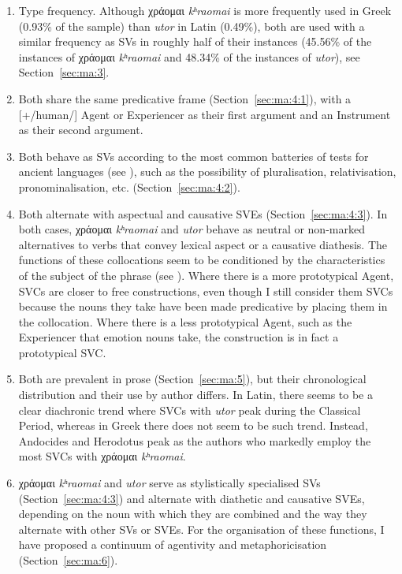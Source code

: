 \documentclass[output=paper,colorlinks,citecolor=brown]{langscibook}
\begin{document}
\begin{enumerate}
   \def\labelenumi{\alph{enumi}.}
 \item Type frequency. Although χράομαι \emph{kʰraomai} is more
   frequently used in Greek (0.93\% of the sample) than \emph{utor} in Latin (0.49\%),
   both are used with a similar frequency as SVs in roughly half of their instances
   (45.56\% of the instances of χράομαι \emph{kʰraomai} and 48.34\% of the instances of \emph{utor}), see
   Section~\ref{sec:ma:3}.
 \item Both share the same predicative frame (Section~\ref{sec:ma:4:1}), with a [+/human/]
   Agent or Experiencer as their first argument and an Instrument as their second argument.
 \item Both behave as SVs according to the most common batteries of tests for ancient
   languages (see \cite{jimenez_lopez_support_2016}), such as the possibility of
   pluralisation, relativisation, pronominalisation, etc. (Section~\ref{sec:ma:4:2}).
 \item Both alternate with aspectual and causative SVEs (Section~\ref{sec:ma:4:3}). In
   both cases, χράομαι \emph{kʰraomai} and \emph{utor} behave as neutral
   or non-marked alternatives to verbs that convey lexical aspect or a causative
   diathesis. The functions of these collocations seem to be conditioned by the
   characteristics of the subject of the phrase (see ). Where there
   is a more prototypical Agent, SVCs are closer to free constructions, even though I
   still consider them SVCs because the nouns they take have been made predicative by
   placing them in the collocation. Where there is a less prototypical Agent, such as the
   Experiencer that emotion nouns take, the construction is in fact a prototypical SVC.
 \item Both are prevalent in prose (Section~\ref{sec:ma:5}), but their chronological
   distribution and their use by author differs. In Latin, there seems to be a clear
   diachronic trend where SVCs with \emph{utor} peak during the Classical Period, whereas
   in Greek there does not seem to be such trend. Instead, Andocides and 
   Herodotus peak as the authors who markedly employ the most SVCs with χράομαι
   \emph{kʰraomai}.
 \item χράομαι \emph{kʰraomai} and \textit{utor} serve as stylistically specialised SVs (Section~\ref{sec:ma:4:3}) and
   alternate with diathetic and causative SVEs, depending on the noun with which they are
   combined and the way they alternate with other SVs or SVEs. For the organisation of
   these functions, I have proposed a continuum of agentivity and metaphoricisation
   (Section~\ref{sec:ma:6}).
\end{enumerate}
\end{document}
